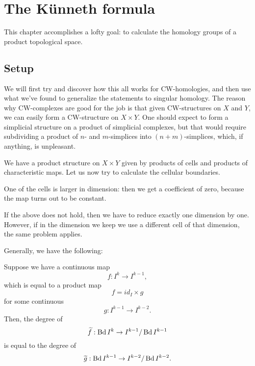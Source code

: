 \chapter{The Künneth formula}

This chapter accomplishes a lofty goal: to calculate the homology groups of a product topological space. 

\section{Setup}

We will first try and discover how this all works for CW-homologies, and then use what we've found to generalize the statements to singular homology. The reason why CW-complexes are good for the job is that given CW-structures on $X$ and $Y$, we can easily form a CW-structure on $X \times Y$. One should expect to form a simplicial structure on a product of simplicial complexes, but that would require subdividing a product of $n$- and $m$-simplices into $(n+m)$-simplices, which, if anything, is unpleasant.

We have a product structure on \( X \times Y \) given by products of cells and products of characteristic maps. Let us now try to calculate the cellular boundaries.

One of the cells is larger in dimension: then we get a coefficient of zero, because the map turns out to be constant.

If the above does not hold, then we have to reduce exactly one dimension by one. However, if in the dimension we keep we use a different cell of that dimension, the same problem applies.

Generally, we have the following:

\begin{lemma}

    Suppose we have a continuous map
    \[
    f: I^k \to I^{k-1},
    \]
    which is equal to a product map
    \[
        f = id_I \times g
    \]
    for some continuous
    \[
        g: I^{k-1} \to I^{k-2}.
    \]
    Then, the degree of
    \[
        \widetilde{f}: \operatorname{Bd} I^k \to I^{k-1}/\operatorname{Bd} I^{k-1}
    \]
    is equal to the degree of
    \[
        \widetilde{g}: \operatorname{Bd} I^{k-1} \to I^{k-2}/\operatorname{Bd} I^{k-2}.
    \]

\end{lemma}

